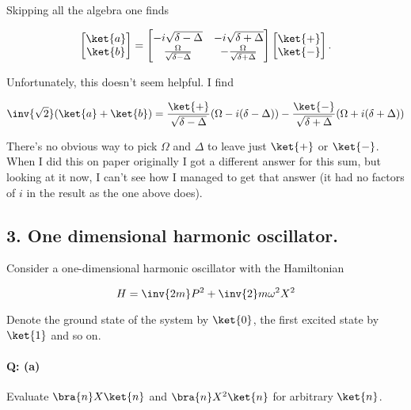 Skipping all the algebra one finds

\begin{equation}\label{eqn:qmIexamPractice2008Dec:2:160}
\begin{bmatrix}
\ket{a} \\
\ket{b} \\
\end{bmatrix}
=
\begin{bmatrix}
-i\sqrt{\delta - \Delta} & -i\sqrt{\delta + \Delta} \\
\frac{\Omega}{\sqrt{\delta - \Delta}} &
-\frac{\Omega}{\sqrt{\delta + \Delta}} 
\end{bmatrix}
\begin{bmatrix}
\ket{+} \\
\ket{-} \\
\end{bmatrix}.
\end{equation}

Unfortunately, this doesn't seem helpful.  I find

\begin{equation}\label{eqn:qmIexamPractice2008Dec:2:170}
\inv{\sqrt{2}} ( \ket{a} + \ket{b} ) = 
\frac{\ket{+}}{\sqrt{\delta - \Delta}}( \Omega - i (\delta - \Delta) )
-\frac{\ket{-}}{\sqrt{\delta + \Delta}}( \Omega + i (\delta + \Delta) )
\end{equation}

There's no obvious way to pick $\Omega$ and $\Delta$ to leave just $\ket{+}$ or $\ket{-}$.  When I did this on paper originally I got a different answer for this sum, but looking at it now, I can't see how I managed to get that answer (it had no factors of $i$ in the result as the one above does).

\subsection{3.  One dimensional harmonic oscillator.}

Consider a one-dimensional harmonic oscillator with the Hamiltonian

\begin{equation}\label{eqn:qmIexamPractice2008Dec:3:10}
H = \inv{2m}P^2 + \inv{2} m \omega^2 X^2
\end{equation}

Denote the ground state of the system by $\ket{0}$, the first excited state by $\ket{1}$ and so on.

\paragraph{Q: (a)}
Evaluate $\bra{n} X \ket{n}$ and $\bra{n} X^2 \ket{n}$ for arbitrary $\ket{n}$.

